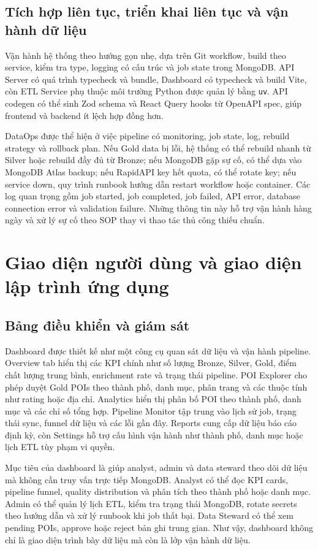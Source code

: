 \documentclass[12pt,a4paper]{article}
\begin{document}
\subsection{Tích hợp liên tục, triển khai liên tục và vận hành dữ liệu}

Vận hành hệ thống theo hướng gọn nhẹ, dựa trên Git workflow, build theo service, kiểm tra type, logging có cấu trúc và job state trong MongoDB. API Server có quá trình typecheck và bundle, Dashboard có typecheck và build Vite, còn ETL Service phụ thuộc môi trường Python được quản lý bằng \texttt{uv}. API codegen có thể sinh Zod schema và React Query hooks từ OpenAPI spec, giúp frontend và backend ít lệch hợp đồng hơn.

DataOps được thể hiện ở việc pipeline có monitoring, job state, log, rebuild strategy và rollback plan. Nếu Gold data bị lỗi, hệ thống có thể rebuild nhanh từ Silver hoặc rebuild đầy đủ từ Bronze; nếu MongoDB gặp sự cố, có thể dựa vào MongoDB Atlas backup; nếu RapidAPI key hết quota, có thể rotate key; nếu service down, quy trình runbook hướng dẫn restart workflow hoặc container. Các log quan trọng gồm job started, job completed, job failed, API error, database connection error và validation failure. Những thông tin này hỗ trợ vận hành hàng ngày và xử lý sự cố theo SOP thay vì thao tác thủ công thiếu chuẩn.

\section{Giao diện người dùng và giao diện lập trình ứng dụng}

\subsection{Bảng điều khiển và giám sát}

Dashboard được thiết kế như một công cụ quan sát dữ liệu và vận hành pipeline. Overview tab hiển thị các KPI chính như số lượng Bronze, Silver, Gold, điểm chất lượng trung bình, enrichment rate và trạng thái pipeline. POI Explorer cho phép duyệt Gold POIs theo thành phố, danh mục, phân trang và các thuộc tính như rating hoặc địa chỉ. Analytics hiển thị phân bố POI theo thành phố, danh mục và các chỉ số tổng hợp. Pipeline Monitor tập trung vào lịch sử job, trạng thái sync, funnel dữ liệu và các lỗi gần đây. Reports cung cấp dữ liệu báo cáo định kỳ, còn Settings hỗ trợ cấu hình vận hành như thành phố, danh mục hoặc lịch ETL tùy phạm vi quyền.

Mục tiêu của dashboard là giúp analyst, admin và data steward theo dõi dữ liệu mà không cần truy vấn trực tiếp MongoDB. Analyst có thể đọc KPI cards, pipeline funnel, quality distribution và phân tích theo thành phố hoặc danh mục. Admin có thể quản lý lịch ETL, kiểm tra trạng thái MongoDB, rotate secrets theo hướng dẫn và xử lý runbook khi job thất bại. Data Steward có thể xem pending POIs, approve hoặc reject bản ghi trung gian. Như vậy, dashboard không chỉ là giao diện trình bày dữ liệu mà còn là lớp vận hành dữ liệu.
\end{document}
